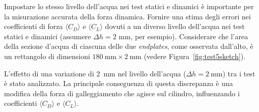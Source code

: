 Impostare lo stesso livello dell'acqua nei test statici e dinamici è importante per la misurazione accurata della forza dinamica. Fornire una stima degli errori nei coefficienti di forza $\langle C_D\rangle$ e $\langle C_L\rangle$ dovuti a un diverso livello dell'acqua nei test statici e dinamici (assumere $\Delta h=2$ mm, per esempio). Considerare che l'area della sezione d'acqua di ciascuna delle due \emph{endplates}, come osservata dall'alto, è un rettangolo di dimensioni $180~\text{mm} \times 2~\text{mm}$ (vedere Figura~\ref{fig:test5sketch}).

\NotionDivider

L'effetto di una variazione di 2~mm nel livello dell'acqua (\(\Delta h = 2 ~ \text{mm}\)) tra i test è stato analizzato. La principale conseguenza di questa discrepanza è una modifica della forza di galleggiamento che agisce sul cilindro, influenzando i coefficienti \(\langle C_D\rangle\) e \(\langle C_L\rangle\).

